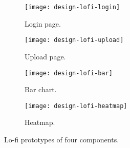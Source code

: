 \begin{figure}[H]
    \centering
    \begin{subfigure}{.49\textwidth}
        \centering
        \texttt{[image: design-lofi-login]}
        \caption{Login page.
        }\label{subfig:lofi-login}
    \end{subfigure}
    \begin{subfigure}{.49\textwidth}
        \centering
        \texttt{[image: design-lofi-upload]}
        \caption{Upload page.
        }\label{subfig:lofi-upload}
    \end{subfigure}
    \par\medskip
    \begin{subfigure}{.49\textwidth}
        \centering
        \texttt{[image: design-lofi-bar]}
        \caption{Bar chart.
        }\label{subfig:lofi-bar}
    \end{subfigure}
    \begin{subfigure}{.49\textwidth}
        \centering
        \texttt{[image: design-lofi-heatmap]}
        \caption{Heatmap.
        }\label{subfig:lofi-heatmap}
    \end{subfigure}
    \caption{Lo-fi prototypes of four components.
    }\label{fig:lofi-prototype}
\end{figure}
